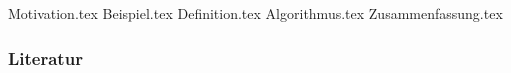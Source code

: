 \documentclass[aspectratio=\BeamerAspectRatio]{beamer}
\begin{document}
\maketitlepage %
\makesectionpopup %

{Motivation.tex}
{Beispiel.tex}
{Definition.tex}
{Algorithmus.tex}
{Zusammenfassung.tex}

\begin{frame}[allowframebreaks]
    \frametitle{Literatur}
    \printbibliography
\end{frame}
\end{document}
